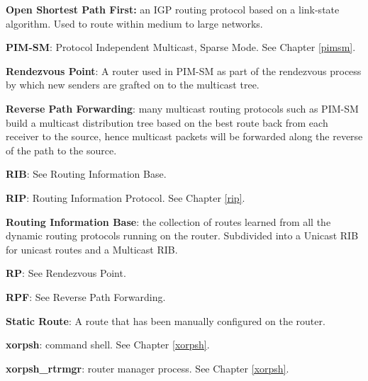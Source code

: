 \begin{description}
\item{\bf Open Shortest Path First:} an IGP routing protocol based on
a link-state algorithm.  Used to route within medium to large networks.
\item{\bf PIM-SM}: Protocol Independent Multicast, Sparse Mode. See
  Chapter \ref{pimsm}.
\item{\bf Rendezvous Point}: A router used in PIM-SM as part of the
rendezvous process by which new senders are grafted on to the
multicast tree.
\item{\bf Reverse Path Forwarding}: many multicast routing protocols
  such as PIM-SM build a multicast distribution tree based on the best
  route back from each receiver to the source, hence multicast packets
  will be forwarded along the reverse of the path to the source.
\item{\bf RIB}: See Routing Information Base.
\item{\bf RIP}: Routing Information Protocol.  See Chapter \ref{rip}.
\item{\bf Routing Information Base}: the collection of routes learned
  from all the dynamic routing protocols running on the router.
  Subdivided into a Unicast RIB for unicast routes and a Multicast
  RIB.
\item{\bf RP}: See Rendezvous Point.
\item{\bf RPF}: See Reverse Path Forwarding.
\item{\bf Static Route}: A route that has been manually configured on
the router.  
\item{\bf xorpsh}: \xorp command shell.  See Chapter \ref{xorpsh}.
\item{\bf xorpsh\_rtrmgr}: \xorp router manager process.  See Chapter
\ref{xorpsh}.
\end{description}
